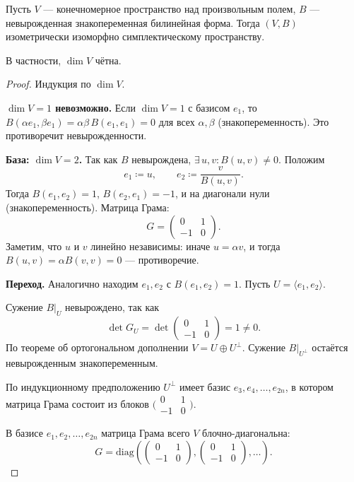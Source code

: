 \begin{theorem}[Дарбу]
    Пусть $V$ --- конечномерное пространство над произвольным полем,
    $B$ --- невырожденная знакопеременная билинейная форма. Тогда $(V, B)$ изометрически изоморфно симплектическому пространству.

    В частности, $\dim V$ чётна.

    \begin{proof}
        Индукция по $\dim V$.

        \textbf{$\dim V = 1$ невозможно.} Если $\dim V = 1$ с базисом $e_1$,
        то $B(\alpha e_1, \beta e_1) = \alpha\beta\, B(e_1, e_1) = 0$ для всех $\alpha, \beta$ (знакопеременность).
        Это противоречит невырожденности.

        \textbf{База: $\dim V = 2$.} Так как $B$ невырождена, $\exists\, u, v\colon B(u, v) \neq 0$. Положим
        \[
            e_1 \coloneqq u, \qquad e_2 \coloneqq \frac{v}{B(u, v)}.
        \]
        Тогда $B(e_1, e_2) = 1$, $B(e_2, e_1) = -1$, и на диагонали нули (знакопеременность). Матрица Грама:
        \[
            G = \begin{pmatrix} 0 & 1 \\ -1 & 0 \end{pmatrix}.
        \]
        Заметим, что $u$ и $v$ линейно независимы: иначе $u = \alpha v$, и тогда $B(u, v) = \alpha B(v, v) = 0$ --- противоречие.

        \textbf{Переход.} Аналогично находим $e_1, e_2$ с $B(e_1, e_2) = 1$. Пусть $U = \langle e_1, e_2 \rangle$.

        Сужение $B\big|_U$ невырождено, так как
        \[
            \det G_U = \det \begin{pmatrix} 0 & 1 \\ -1 & 0 \end{pmatrix} = 1 \neq 0.
        \]
        По теореме об ортогональном дополнении $V = U \oplus U^\perp$. Сужение $B\big|_{U^\perp}$ остаётся невырожденным знакопеременным.

        По индукционному предположению $U^\perp$ имеет базис $e_3, e_4, \dots, e_{2n}$,
        в котором матрица Грама состоит из блоков $\bigl(\begin{smallmatrix}0 & 1 \\ -1 & 0\end{smallmatrix}\bigr)$.

        В базисе $e_1, e_2, \dots, e_{2n}$ матрица Грама всего $V$ блочно-диагональна:
        \[
            G = \mathrm{diag}\left(
                \begin{pmatrix} 0 & 1 \\ -1 & 0 \end{pmatrix},
                \begin{pmatrix} 0 & 1 \\ -1 & 0 \end{pmatrix},
                \dots
            \right).
        \]


\end{proof}
\end{theorem}
